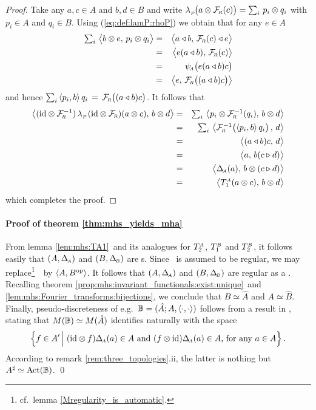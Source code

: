 \begin{proof}
Take any $a,c \in A$ and $b,d \in B$ and write
$\lp \! \left(a \tens \FR(c) \vertM\right) = \sum_i \,p_i \tens q_i$
with $p_i \in A$ and $q_i \in B$.
Using (\ref{eq:def:lamP:rhoP}) we obtain that for any $e\in A$
\begin{eqnarray*}
\textstyle \sum_i \,\pairM{b\tens e}{p_i \tens q_i}
  &=&
\pairM{a\ract b}{\FR(c) \ract e}
\\&=&
\pairM{e(a\ract b)}{\FR(c)}
\\&=&
\psiA \! \left(e(a\ract b)c\vertM\right)
\\&=&
\pairM{e}{\FR\! \left((a\ract b)c\vertM\right)}
\end{eqnarray*}
and hence $\sum_i \,\pair{p_i}{b}\, q_i \,=\, \FR\! \left((a\ract b)c\vertM\right)$.
It follows that
\begin{eqnarray*}
\pairM{(\id \tens \FR^{-1}) \,\lp\, (\id \tens \FR)(a\tens c)}{b\tens d}
  &=&
\textstyle \sum_i \, \pairM{p_i \tens \FR^{-1}(q_i)}{b\tens d}
\\&=&
\textstyle \sum_i \, \pairM{\FR^{-1}\!\left(\pair{p_i}{b} \, q_i\vertM\right)}{d}
\\&=&
\pairM{(a\ract b)c}{d}
\\&=&
\pairM{a}{b(c \lact d)}
\\&=&
\pairM{\DeltaA(a)}{b\tens (c \lact d)}
\\&=&
\pairM{\TA{1}(a \tens c)}{b\tens d}
\end{eqnarray*}
which completes the proof.
\end{proof}



\paragraph{Proof of theorem \ref{thm:mhs_yields_mha}}
From lemma \ref{lem:mhs:TA1}\ and its analogues for $T_{2}^{\scriptscriptstyle A}$, $T_{1}^{\scriptscriptstyle B}$ and $T_{2}^{\scriptscriptstyle B}$,
it follows easily that $(A,\Delta_{\scriptscriptstyle \! A})$ and $(B,\Delta_{\scriptscriptstyle \! B})$ are \mha s.
Since \pairAB\ is assumed to be regular, we may
replace\footnote{cf.\ lemma \ref{Mregularity_is_automatic}.}\ \pairAB\ by $\langle A,B^{\rm op} \rangle$.
It follows that $(A,\Delta_{\scriptscriptstyle \! A})$ and $(B,\Delta_{\scriptscriptstyle \! B})$ are regular as a \mha\@.
Recalling theorem \ref{prop:mhs:invariant_functionals:exist:unique}\ and
\ref{lem:mhs:Fourier_transforms:bijections},
we conclude that $B\simeq \hat{A}$ and $A\simeq \hat{B}$.
Finally, pseudo-discreteness of e.g.\ $\mathbb{B}=(\hat{A};A,\langle\cdot, \cdot\rangle)$
follows from a result in \cite{Kust:corep}, stating that
$M(\mathbb{B}) \simeq M(\hat{A})$ identifies naturally with the space
$$ \left\{ f \in A' \left|\vertL\right.
     (\id \tens f)\DeltaA(a) \in A  \mbox{ and } (f \tens \id)\DeltaA(a) \in A
     \mbox{, for any } a\in A \right\}. $$
According to remark \ref{rem:three_topologies}.ii,
the latter is nothing but $A^\sharp \simeq \mbox{\rm Act}(\mathbb{B})$.
\hfill \qed
